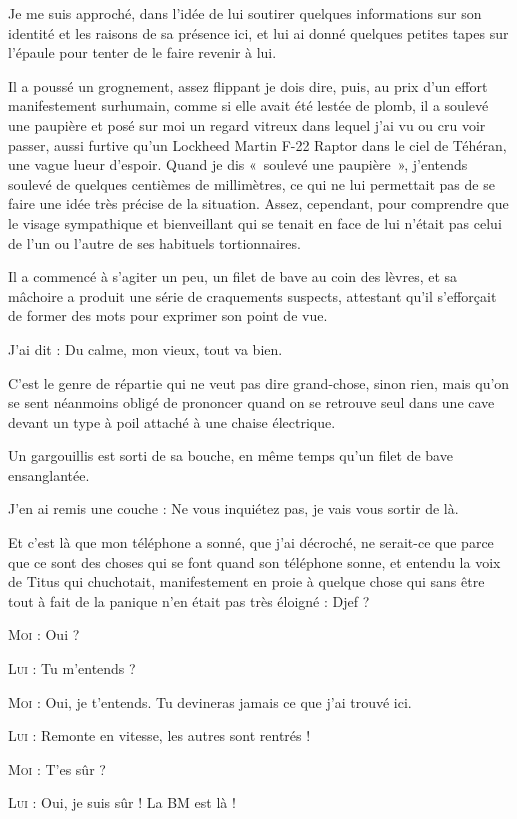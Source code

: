 Je me suis approché, dans l’idée de lui soutirer quelques informations sur son identité et les raisons de sa présence ici, et lui ai donné quelques petites tapes sur l’épaule pour tenter de le faire revenir à lui.

Il a poussé un grognement, assez flippant je dois dire, puis, au prix d’un effort manifestement surhumain, comme si elle avait été lestée de plomb, il a soulevé une paupière et posé sur moi un regard vitreux dans lequel j’ai vu ou cru voir passer, aussi furtive qu’un Lockheed Martin F-22 Raptor dans le ciel de Téhéran, une vague lueur d’espoir. Quand je dis «~soulevé une paupière~», j’entends soulevé de quelques centièmes de millimètres, ce qui ne lui permettait pas de se faire une idée très précise de la situation. Assez, cependant, pour comprendre que le visage sympathique et bienveillant qui se tenait en face de lui n’était pas celui de l’un ou l’autre de ses habituels tortionnaires.

Il a commencé à s’agiter un peu, un filet de bave au coin des lèvres, et sa mâchoire a produit une série de craquements suspects, attestant qu’il s’efforçait de former des mots pour exprimer son point de vue.

J’ai dit : Du calme, mon vieux, tout va bien.

C’est le genre de répartie qui ne veut pas dire grand-chose, sinon rien, mais qu’on se sent néanmoins obligé de prononcer quand on se retrouve seul dans une cave devant un type à poil attaché à une chaise électrique.

Un gargouillis est sorti de sa bouche, en même temps qu’un filet de bave ensanglantée.

J’en ai remis une couche : Ne vous inquiétez pas, je vais vous sortir de là.

Et c’est là que mon téléphone a sonné, que j’ai décroché, ne serait-ce que parce que ce sont des choses qui se font quand son téléphone sonne, et entendu la voix de Titus qui chuchotait, manifestement en proie à quelque chose qui sans être tout à fait de la panique n’en était pas très éloigné : Djef ?

\textsc{Moi} : Oui ?

\textsc{Lui} : Tu m’entends ?

\textsc{Moi} : Oui, je t’entends. Tu devineras jamais ce que j’ai trouvé ici.

\textsc{Lui} : Remonte en vitesse, les autres sont rentrés !

\textsc{Moi} : T’es sûr ?

\textsc{Lui} : Oui, je suis sûr ! La BM est là !

